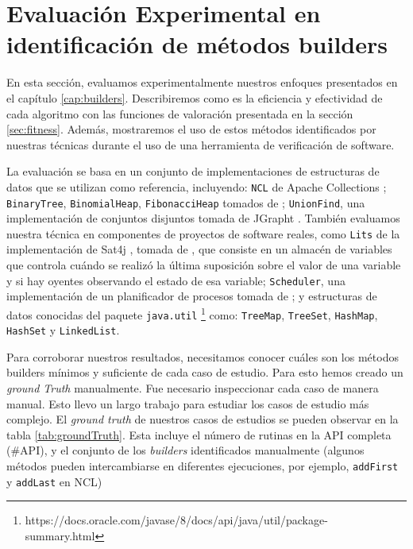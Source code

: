 
\section{Evaluación Experimental en identificación de métodos builders}
\label{sec:buildersExp}
En esta sección, evaluamos experimentalmente nuestros enfoques presentados en el capítulo \ref{cap:builders}. Describiremos como es la eficiencia y efectividad de cada algoritmo con las funciones de valoración presentada en la sección \ref{sec:fitness}. Además, mostraremos el uso de estos métodos identificados por nuestras técnicas durante el uso de una herramienta de verificación de software.

La evaluación se basa en un conjunto de implementaciones de estructuras de datos que se utilizan como referencia, incluyendo: \verb"NCL" de Apache Collections \cite{apache}; \verb"BinaryTree", \verb"BinomialHeap", \verb"FibonacciHeap" tomados de \cite{Visser:2006}; \verb"UnionFind", una implementación de conjuntos disjuntos tomada de JGrapht \cite{jgrapht}. También evaluamos nuestra técnica en componentes de proyectos de software reales, como \verb"Lits" de la implementación de Sat4j \cite{sat4j}, tomada de \cite{Loncaric:2018}, que consiste en un almacén de variables que controla cuándo se realizó la última suposición sobre el valor de una variable y si hay oyentes observando el estado de esa variable; \verb"Scheduler", una implementación de un planificador de procesos tomada de \cite{sir}; y estructuras de datos conocidas del paquete \verb"java.util" \footnote{https://docs.oracle.com/javase/8/docs/api/java/util/package-summary.html} como: \verb"TreeMap", \verb"TreeSet", \verb"HashMap", \verb"HashSet" y \verb"LinkedList". 

Para corroborar nuestros resultados, necesitamos conocer cuáles son los métodos builders mínimos y suficiente de cada caso de estudio. Para esto hemos creado un \emph{ground Truth} manualmente. Fue necesario inspeccionar cada caso de manera manual. Esto llevo un largo trabajo para estudiar los casos de estudio más complejo. El \emph{ground truth} de nuestros casos de estudios se pueden observar en la tabla \ref{tab:groundTruth}. Esta incluye el número de rutinas en la API completa (\#API), y el conjunto de los \emph{builders} identificados manualmente (algunos métodos pueden intercambiarse en diferentes ejecuciones, por ejemplo, \texttt{addFirst} y \texttt{addLast} en NCL)
    
